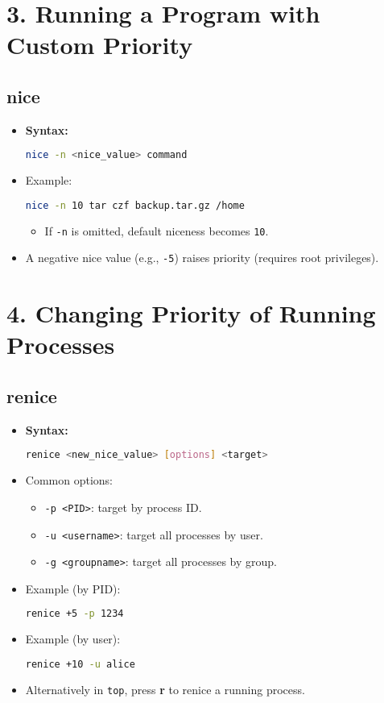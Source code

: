\documentclass[a4paper]{report}
\begin{document}
\section*{3. Running a Program with Custom Priority}

\subsection*{nice}
\begin{itemize}
    \item \textbf{Syntax:}
\begin{lstlisting}[language=bash]
nice -n <nice_value> command
\end{lstlisting}
    \item Example:
\begin{lstlisting}[language=bash]
nice -n 10 tar czf backup.tar.gz /home
\end{lstlisting}
\begin{itemize}
    \item If \texttt{-n} is omitted, default niceness becomes \texttt{10}.
\end{itemize}
    
    \item A negative nice value (e.g., \texttt{-5}) raises priority (requires root privileges).
\end{itemize}

\section*{4. Changing Priority of Running Processes}

\subsection*{renice}
\begin{itemize}
    \item \textbf{Syntax:}
\begin{lstlisting}[language=bash]
renice <new_nice_value> [options] <target>
\end{lstlisting}
    \item Common options:
    \begin{itemize}
        \item \texttt{-p <PID>}: target by process ID.
        \item \texttt{-u <username>}: target all processes by user.
        \item \texttt{-g <groupname>}: target all processes by group.
    \end{itemize}
    \item Example (by PID):
\begin{lstlisting}[language=bash]
renice +5 -p 1234
\end{lstlisting}
    \item Example (by user):
\begin{lstlisting}[language=bash]
renice +10 -u alice
\end{lstlisting}
    \item Alternatively in \texttt{top}, press \textbf{r} to renice a running process.
\end{itemize}
\end{document}
